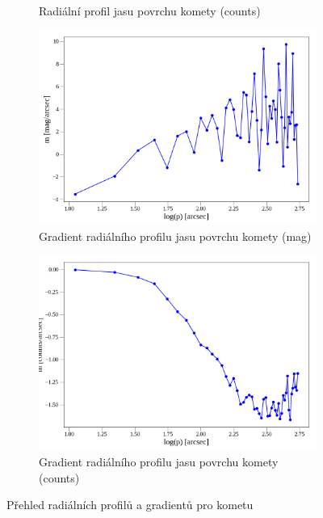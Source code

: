 \documentclass[a4paper,11pt]{article}
\begin{document}
\begin{figure}[htbp]
\begin{subfigure}[t]{0.48\textwidth}
            \caption{Radiální profil jasu povrchu komety (counts)}
            \label{fig:sbp_counts}
        \end{subfigure}
        \vspace{10pt} 
        \begin{subfigure}[t]{0.48\textwidth}
            \centering
            \includegraphics[width=\textwidth]{grad.png}
            \captionsetup{justification=centering, font=footnotesize}
            \caption{Gradient radiálního profilu jasu povrchu komety (mag)}
            \label{fig:grad}
        \end{subfigure}
        \hfill 
        \begin{subfigure}[t]{0.48\textwidth}
            \centering
            \includegraphics[width=\textwidth]{grad_counts.png}
            \captionsetup{justification=centering, font=footnotesize}
            \caption{Gradient radiálního profilu jasu povrchu komety (counts)}
            \label{fig:grad_counts}
        \end{subfigure}
        \caption{Přehled radiálních profilů a gradientů pro kometu}
        \label{fig:all_plots}
    \end{figure}
\end{document}
